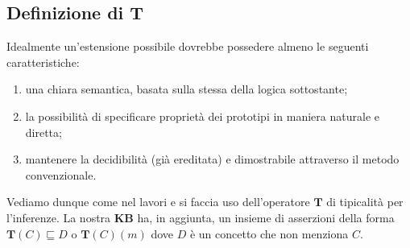 \subsection{Definizione di T}
Idealmente un'estensione possibile dovrebbe possedere almeno le seguenti caratteristiche:
\begin{enumerate}
	\item una chiara semantica, basata sulla stessa della logica sottostante;
	\item la possibilità di specificare proprietà dei prototipi in maniera naturale e diretta;
	\item mantenere la decidibilità (già ereditata) e dimostrabile attraverso il metodo convenzionale.
\end{enumerate}
Vediamo dunque come nel lavori \cite{DLExtension} e \cite{COCOS} si faccia uso dell'operatore $ \mathbf{T} $ di 
tipicalità per l'inferenze. La nostra \textbf{KB} ha, in aggiunta, un insieme di asserzioni della forma
$ \mathbf{T}(C) \sqsubseteq D $ o $ \mathbf{T}(C)(m) $ dove $ D $ è un concetto che non menziona $ C $.

